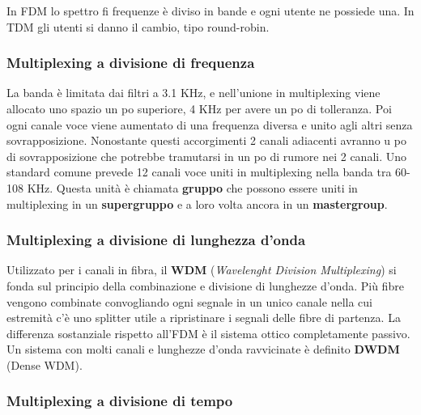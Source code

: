 In FDM lo spettro fi frequenze è diviso in bande e ogni utente ne possiede una. In TDM gli utenti si danno il cambio, tipo round-robin.

\subsubsection*{Multiplexing a divisione di frequenza}

La banda è limitata dai filtri a 3.1 KHz, e nell'unione in multiplexing viene allocato uno spazio un po superiore, 4 KHz per avere un po di tolleranza. Poi ogni canale voce viene aumentato di una frequenza diversa e unito agli altri senza sovrapposizione. Nonostante questi accorgimenti 2 canali adiacenti avranno u po di sovrapposizione che potrebbe tramutarsi in un po di rumore nei 2 canali. Uno standard comune prevede 12 canali voce uniti in multiplexing nella banda tra 60-108 KHz. Questa unità è chiamata \textbf{gruppo} che possono essere uniti in multiplexing in un \textbf{supergruppo} e a loro volta ancora in un \textbf{mastergroup}.

\subsubsection*{Multiplexing a divisione di lunghezza d'onda}

Utilizzato per i canali in fibra, il \textbf{WDM} (\textit{Wavelenght Division Multiplexing}) si fonda sul principio della combinazione e divisione di lunghezze d'onda. Più fibre vengono combinate convogliando ogni segnale in un unico canale nella cui estremità c'è uno splitter utile a ripristinare i segnali delle fibre di partenza. La differenza sostanziale rispetto all'FDM è il sistema ottico completamente passivo. Un sistema con molti canali e lunghezze d'onda ravvicinate è definito \textbf{DWDM} (Dense WDM).

\subsubsection*{Multiplexing a divisione di tempo}


